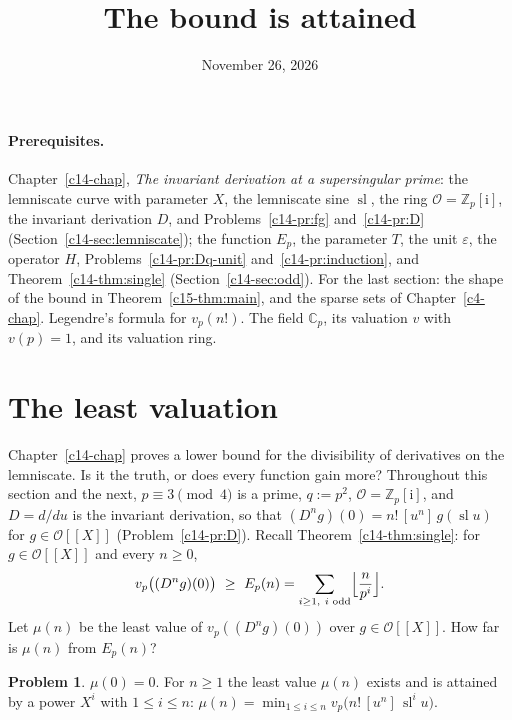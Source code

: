 \documentclass[reqno]{amsart}
\title{The bound is attained}
\author{}
\date{November 26, 2026}
\newcounter{chap}
\theoremstyle{definition}
\newtheorem{problem}{Problem}[section]
\theoremstyle{plain}
\newcommand{\Z}{\mathbb{Z}}
\newcommand{\C}{\mathbb{C}}
\newcommand{\ii}{\mathrm{i}}
\newcommand{\Oc}{\mathcal{O}}
\newcommand{\sll}{\operatorname{sl}}
\begin{document}
\maketitle
{}\label{chap}

\paragraph{Prerequisites.}
Chapter~\ref{c14-chap}, \emph{The invariant derivation at a supersingular prime}: the lemniscate curve with parameter \(X\), the lemniscate sine \(\sll\), the ring \(\Oc = \Z_p[\ii]\), the invariant derivation \(D\), and Problems~\ref{c14-pr:fg} and~\ref{c14-pr:D} (Section~\ref{c14-sec:lemniscate}); the function \(E_p\), the parameter \(T\), the unit \(\varepsilon\), the operator \(H\), Problems~\ref{c14-pr:Dq-unit} and~\ref{c14-pr:induction}, and Theorem~\ref{c14-thm:single} (Section~\ref{c14-sec:odd}).  For the last section: the shape of the bound in Theorem~\ref{c15-thm:main}, and the sparse sets of Chapter~\ref{c4-chap}.  Legendre's formula for \(v_p(n!)\).  The field \(\C_p\), its valuation \(v\) with \(v(p) = 1\), and its valuation ring.

\section{The least valuation}\label{sec:least}

Chapter~\ref{c14-chap} proves a lower bound for the divisibility of derivatives on the lemniscate.  Is it the truth, or does every function gain more?  Throughout this section and the next, \(p \equiv 3 \pmod 4\) is a prime, \(q := p^2\), \(\Oc = \Z_p[\ii]\), and \(D = d/du\) is the invariant derivation, so that \((D^n g)(0) = n!\,[u^n]\, g(\sll u)\) for \(g \in \Oc[[X]]\) (Problem~\ref{c14-pr:D}).  Recall Theorem~\ref{c14-thm:single}: for \(g \in \Oc[[X]]\) and every \(n \ge 0\),
\[
  v_p\bigl((D^n g)(0)\bigr) \ \ge\ E_p(n) = \sum_{i \ge 1,\ i \text{ odd}} \Bigl\lfloor \frac{n}{p^i} \Bigr\rfloor .
\]
Let \(\mu(n)\) be the least value of \(v_p((D^n g)(0))\) over \(g \in \Oc[[X]]\).  How far is \(\mu(n)\) from \(E_p(n)\)?

\begin{problem}\label{pr:monomial}
\(\mu(0) = 0\).  For \(n \ge 1\) the least value \(\mu(n)\) exists and is attained by a power \(X^i\) with \(1 \le i \le n\):
\(\mu(n) = \min_{1 \le i \le n} v_p\bigl(n!\,[u^n]\, \sll^i u\bigr)\).
\end{problem}
\end{document}

